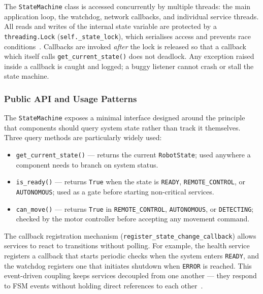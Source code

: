 The \texttt{StateMachine} class is accessed concurrently by multiple
threads: the main application loop, the watchdog, network callbacks,
and individual service threads. All reads and writes of the internal
state variable are protected by a \texttt{threading.Lock}
(\texttt{self.\_state\_lock}), which serialises access and prevents
race conditions~\cite{silberschatz2018os}. Callbacks are invoked
\emph{after} the lock is released so that a callback which itself
calls \texttt{get\_current\_state()} does not deadlock. Any exception
raised inside a callback is caught and logged; a buggy listener cannot
crash or stall the state machine.
 
\subsubsection{Public API and Usage Patterns}
 
The \texttt{StateMachine} exposes a minimal interface designed around
the principle that components should query system state rather than
track it themselves. Three query methods are particularly widely used:
 
\begin{itemize}
    \item \texttt{get\_current\_state()} — returns the current
          \texttt{RobotState}; used anywhere a component needs to
          branch on system status.
    \item \texttt{is\_ready()} — returns \texttt{True} when the
          state is \texttt{READY}, \texttt{REMOTE\_CONTROL}, or
          \texttt{AUTONOMOUS}; used as a gate before starting
          non-critical services.
    \item \texttt{can\_move()} — returns \texttt{True} in
          \texttt{REMOTE\_CONTROL}, \texttt{AUTONOMOUS}, or
          \texttt{DETECTING}; checked by the motor controller before
          accepting any movement command.
\end{itemize}
 
The callback registration mechanism (\texttt{register\_state\_change\_callback})
allows services to react to transitions without polling. For example,
the health service registers a callback that starts periodic checks
when the system enters \texttt{READY}, and the watchdog registers one
that initiates shutdown when \texttt{ERROR} is reached. This
event-driven coupling keeps services decoupled from one
another — they respond to FSM events without holding direct references
to each other~\cite{gamma1994design}.


